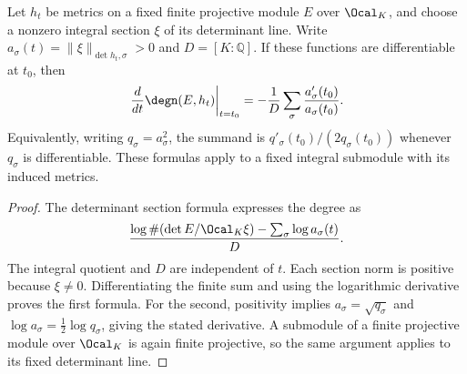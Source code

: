 \begin{lemma}
\label{lem:arithmetic-degree-derivative}
\leanok
Let $h_t$ be metrics on a fixed finite projective module $E$ over
$\Ocal_K$, and choose a nonzero integral section $\xi$ of its determinant
line. Write $a_\sigma(t)=\|\xi\|_{\det h_t,\sigma}>0$ and
$D=[K:\mathbb Q]$. If these functions are differentiable at $t_0$,
then
\[
 \left.\frac{d}{dt}\degn(E,h_t)\right|_{t=t_0}
 =-\frac1D\sum_\sigma\frac{a'_\sigma(t_0)}{a_\sigma(t_0)}.
\]
Equivalently, writing $q_\sigma=a_\sigma^2$, the summand is
$q'_\sigma(t_0)/(2q_\sigma(t_0))$ whenever $q_\sigma$ is differentiable.
These formulas apply to a fixed integral submodule with its induced metrics.
\end{lemma}
\begin{proof}
The determinant section formula expresses the degree as
\[
 \frac{\log\#(\det E/\Ocal_K\xi)-\sum_\sigma\log a_\sigma(t)}D.
\]
The integral quotient and $D$ are independent of $t$. Each section norm
is positive because $\xi\ne0$. Differentiating the finite sum and using
the logarithmic derivative proves the first formula.
For the second, positivity implies $a_\sigma=\sqrt{q_\sigma}$ and
$\log a_\sigma=\frac12\log q_\sigma$, giving the stated derivative.
A submodule of a finite projective module over $\Ocal_K$ is again finite
projective, so the same argument applies to its fixed determinant line.
\end{proof}

